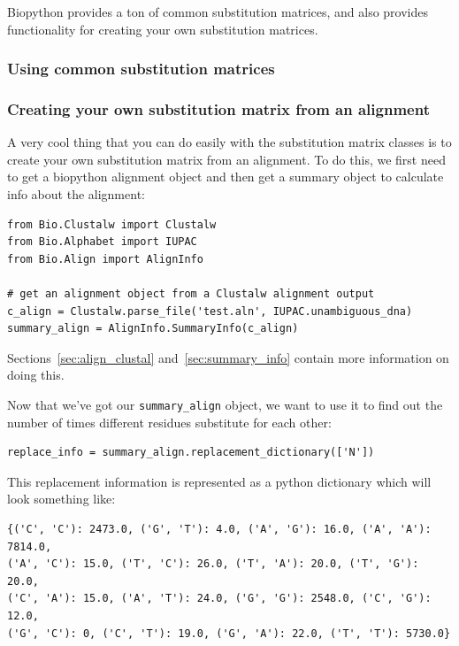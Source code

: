 \documentclass{article}
\begin{document}
Biopython provides a ton of common substitution matrices, and also provides functionality for creating your own substitution matrices.

\subsubsection{Using common substitution matrices}

\subsubsection{Creating your own substitution matrix from an alignment}

A very cool thing that you can do easily with the substitution matrix classes is to create your own substitution matrix from an alignment. To do this, we first need to get a biopython alignment object and then get a summary object to calculate info about the alignment:

\begin{verbatim}
from Bio.Clustalw import Clustalw
from Bio.Alphabet import IUPAC
from Bio.Align import AlignInfo

# get an alignment object from a Clustalw alignment output
c_align = Clustalw.parse_file('test.aln', IUPAC.unambiguous_dna)
summary_align = AlignInfo.SummaryInfo(c_align)
\end{verbatim}

Sections~\ref{sec:align_clustal} and~\ref{sec:summary_info} contain more information on doing this.


Now that we've got our \verb|summary_align| object, we want to use it to find out the number of times different residues substitute for each other:

\begin{verbatim}
replace_info = summary_align.replacement_dictionary(['N'])
\end{verbatim}

This replacement information is represented as a python dictionary which will look something like:

\begin{verbatim}
{('C', 'C'): 2473.0, ('G', 'T'): 4.0, ('A', 'G'): 16.0, ('A', 'A'): 7814.0, 
('A', 'C'): 15.0, ('T', 'C'): 26.0, ('T', 'A'): 20.0, ('T', 'G'): 20.0, 
('C', 'A'): 15.0, ('A', 'T'): 24.0, ('G', 'G'): 2548.0, ('C', 'G'): 12.0, 
('G', 'C'): 0, ('C', 'T'): 19.0, ('G', 'A'): 22.0, ('T', 'T'): 5730.0}
\end{verbatim}
\end{document}
